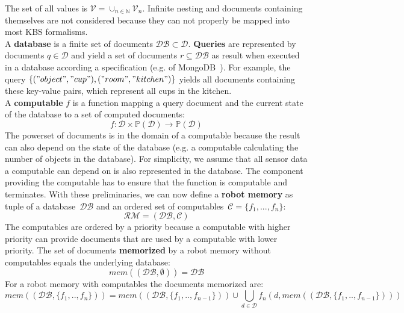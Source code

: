 The set of all values is $\mathcal{V}=\cup_{n\in\mathbb{N}}\mathcal{V}_n$.
  Infinite nesting and
documents containing themselves are not considered because they can
not properly be mapped into most KBS formalisms.
\\
A \textbf{database} is a finite set of documents $\mathcal{DB} \subset \mathcal{D}$.
\textbf{Queries} are represented by documents $q\in\mathcal{D}$ and
yield a set of documents $r\subseteq\mathcal{DB}$ as result when
executed in a database according a specification (e.g. of
MongoDB~\cite{mongodb}). For example, the query
$\{("object","cup"),("room","kitchen")\}$ yields all documents
containing these key-value pairs, which represent all cups in the
kitchen.
\\
A \textbf{computable} $f$ is a function mapping a query document and
the current state of the database to a set of computed documents:
$$f: \mathcal{D}\times\mathbb{P}(\mathcal{D}) \rightarrow \mathbb{P}(\mathcal{D})$$
The powerset of documents is in the domain of a computable because the
result can also depend on the state of the database (e.g. a computable
calculating the number of objects in the database). For simplicity, we
assume that all sensor data a computable can depend on is also
represented in the database. The component providing the computable
has to ensure that the function is computable and terminates.
%
With these preliminaries, we can now define a \textbf{robot memory} as tuple
of a database~$\mathcal{DB}$ and an ordered set of computables~$\mathcal{C}=\{f_1,...,f_n\}$:
$$\mathcal{RM}=(\mathcal{DB},\mathcal{C})$$
%
The computables are ordered by a priority because a computable with
higher priority can provide documents that are used by a computable
with lower priority. The set of documents \textbf{memorized} by a
robot memory without computables equals the underlying database:
$$mem(\mathcal{(DB,\emptyset)})=\mathcal{DB}$$
For a robot memory with computables the documents memorized are:
$$mem((\mathcal{DB},\{f_1,..,f_n\}))=mem((\mathcal{DB},\{f_1,..,f_{n-1}\})) \cup \bigcup_{d\in\mathcal{D}}f_n(d,mem((\mathcal{DB},\{f_1,..,f_{n-1}\})))$$

